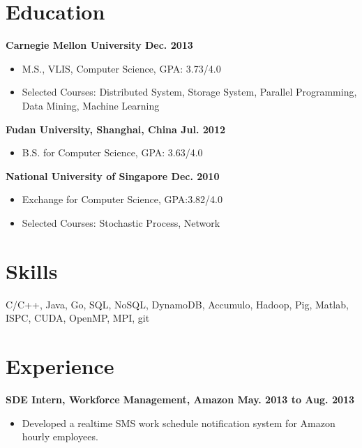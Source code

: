 \documentclass[]{res}
\begin{document}
\address{412-577-8056 \\paulyang1211@gmail.com}
\address{401 Shady Ave APT C207\\Pittsburgh, PA 15206}



\begin{resume}
\section{Education}
 {\bf Carnegie Mellon University \hfill Dec. 2013}
 \begin{itemize} \itemsep -2pt  %
 \item M.S., VLIS, Computer Science, GPA: 3.73/4.0
 \item
    Selected Courses: Distributed System, Storage System, Parallel Programming, Data Mining, Machine Learning 
 \end{itemize}
 {\bf Fudan University, Shanghai, China \hfill Jul. 2012}
 \begin{itemize} \itemsep -2pt  %
 \item B.S. for Computer Science, GPA: 3.63/4.0
 \end{itemize}
 
 {\bf National University of Singapore \hfill Dec. 2010}
 \begin{itemize} \itemsep -2pt  %
 \item Exchange for Computer Science, GPA:3.82/4.0
 \item
    Selected Courses: Stochastic Process, Network
 \end{itemize}

\section{Skills}
C/C++, Java, Go, SQL, NoSQL, DynamoDB, Accumulo, Hadoop, Pig, Matlab, ISPC, CUDA, OpenMP, MPI, git

\section{Experience}

{\bf SDE Intern, Workforce Management, Amazon \hfill  May. 2013 to Aug. 2013}
\begin{itemize} \itemsep -2pt %
\item Developed a realtime SMS work schedule notification system for Amazon hourly employees. 
\end{itemize}


\end{resume}
\end{document}
